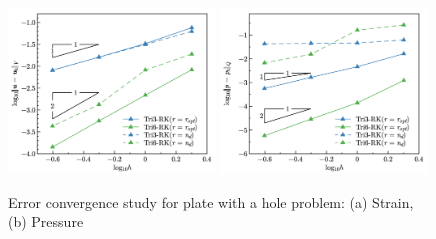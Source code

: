 \begin{figure}[H]
\centering
\includegraphics[width=0.49\textwidth]{png/plate_with_hole_Hdev.png}
\includegraphics[width=0.49\textwidth]{png/plate_with_hole_L2_p.png}
\caption{Error convergence study for plate with a hole problem: (a) Strain, (b) Pressure}\label{fg:plate_with_hole_convergece}
\end{figure}

